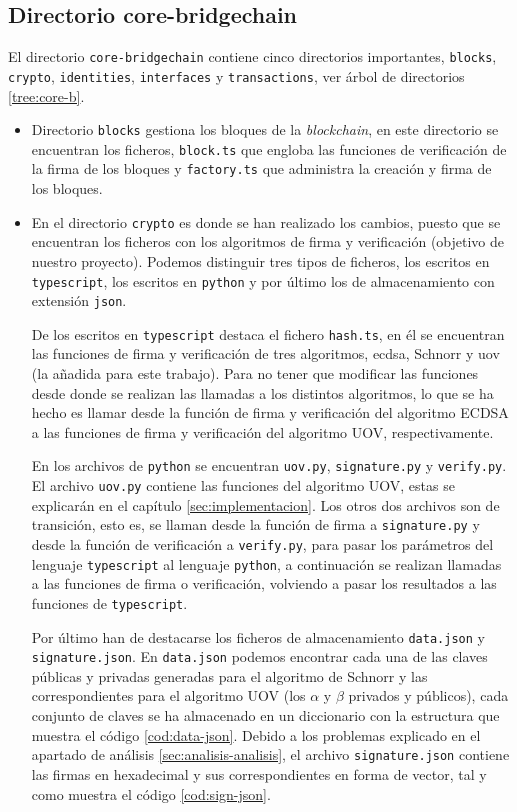 \subsection{Directorio core-bridgechain}

El directorio \texttt{core-bridgechain} contiene cinco directorios importantes, \texttt{blocks}, \texttt{crypto}, \texttt{identities}, \texttt{interfaces} y \texttt{transactions}, ver árbol de directorios \ref{tree:core-b}.

\begin{itemize}
	\item Directorio \texttt{blocks} gestiona los bloques de la \textit{blockchain}, en este directorio se encuentran los ficheros, \texttt{block.ts} que engloba las funciones de verificación de la firma de los bloques y \texttt{factory.ts} que administra la creación y firma de los bloques.
	\item En el directorio \texttt{crypto} es donde se han realizado los cambios, puesto que se encuentran los ficheros con los algoritmos de firma y verificación (objetivo de nuestro proyecto). Podemos distinguir tres tipos de ficheros, los escritos en \texttt{typescript}, los escritos en \texttt{python} y por último los de almacenamiento con extensión \texttt{json}.
	
	De los escritos en \texttt{typescript} destaca el fichero \texttt{hash.ts}, en él se encuentran las funciones de firma y verificación de tres algoritmos, \acrshort{ecdsa}, Schnorr\cite{schnorr} y \acrshort{uov} (la añadida para este trabajo). Para no tener que modificar las funciones desde donde se realizan las llamadas a los distintos algoritmos, lo que se ha hecho es llamar desde la función de firma y verificación del algoritmo ECDSA a las funciones de firma y verificación del algoritmo UOV, respectivamente.
	
	En los archivos de \texttt{python} se encuentran \texttt{uov.py}, \texttt{signature.py} y \texttt{verify.py}. El archivo \texttt{uov.py} contiene las funciones del algoritmo UOV, estas se explicarán en el capítulo \ref{sec:implementacion}. Los otros dos archivos son de transición, esto es, se llaman desde la función de firma a \texttt{signature.py} y desde la función de verificación a \texttt{verify.py}, para pasar los parámetros del lenguaje \texttt{typescript} al lenguaje \texttt{python}, a continuación se realizan llamadas a las funciones de firma o verificación, volviendo a pasar los resultados a las funciones de \texttt{typescript}.
	
	Por último han de destacarse los ficheros de almacenamiento \texttt{data.json} y \texttt{signature.json}. En \texttt{data.json} podemos encontrar cada una de las claves públicas y privadas generadas para el algoritmo de Schnorr y las correspondientes para el algoritmo UOV (los $\alpha$ y $\beta$ privados y públicos), cada conjunto de claves se ha almacenado en un diccionario con la estructura que muestra el código \ref{cod:data-json}. Debido a los problemas explicado en el apartado de análisis \ref{sec:analisis-analisis}, el archivo \texttt{signature.json} contiene las firmas en hexadecimal y sus correspondientes en forma de vector, tal y como muestra el código \ref{cod:sign-json}.
	

\end{itemize}
